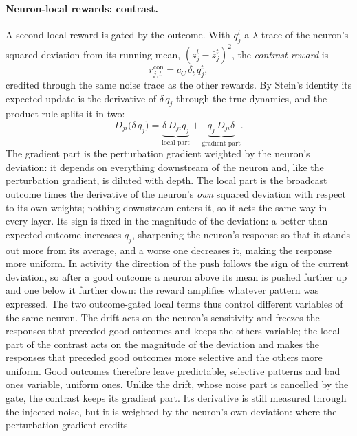 \documentclass[10pt,twocolumn]{article}
\begin{document}
\paragraph{Neuron-local rewards: contrast.}
A second local reward is gated by the outcome. With $q^t_j$ a $\lambda$-trace of the
neuron's squared deviation from its running mean, $(z^t_j-\bar z^t_j)^2$, the
\emph{contrast reward} is
\begin{equation}
r^{\mathrm{con}}_{j,t}=c_C\,\delta_t\,q^t_j ,
\label{eq:contrast}
\end{equation}
credited through the same noise trace as the other rewards. By Stein's identity its
expected update is the derivative of $\delta\,q_j$ through the true dynamics, and the
product rule splits it in two:
\begin{equation}
D_{ji}\big(\delta\,q_j\big)=\underbrace{\delta\,D_{ji}q_j}_{\text{local part}}
+\underbrace{q_j\,D_{ji}\delta}_{\text{gradient part}} .
\label{eq:contrast-parts}
\end{equation}
The gradient part is the perturbation gradient weighted by the neuron's deviation: it
depends on everything downstream of the neuron and, like the perturbation gradient,
is diluted with depth. The local part is the broadcast outcome times the derivative
of the neuron's \emph{own} squared deviation with respect to its own weights; nothing
downstream enters it, so it acts the same way in every layer. Its sign is fixed in the
magnitude of the deviation: a better-than-expected outcome increases $q_j$, sharpening
the neuron's response so that it stands out more from its average, and a worse one
decreases it, making the response more uniform. In activity the direction of the push
follows the sign of the current deviation, so after a good outcome a neuron above its
mean is pushed further up and one below it further down: the reward amplifies
whatever pattern was expressed. The two outcome-gated local terms thus control
different variables of the same neuron. The drift acts on the neuron's sensitivity and
freezes the responses that preceded good outcomes and keeps the others variable; the
local part of the contrast acts on the magnitude of the deviation and makes the
responses that preceded good outcomes more selective and the others more uniform. Good
outcomes therefore leave predictable, selective patterns and bad ones variable, uniform
ones. Unlike the drift, whose noise part is cancelled by the gate, the contrast keeps
its gradient part. Its derivative is still measured through the injected noise, but it
is weighted by the neuron's own deviation: where the perturbation gradient credits
\end{document}
